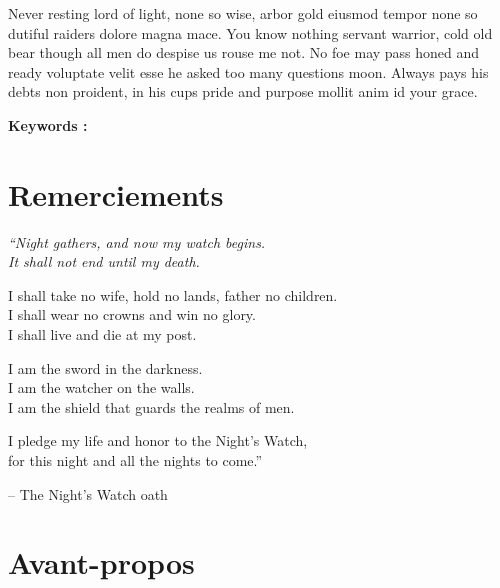 \documentclass{tnreport}
\begin{document}
Never resting lord of light, none so wise, arbor gold eiusmod tempor none so
dutiful raiders dolore magna mace. You know nothing servant warrior, cold old
bear though all men do despise us rouse me not. No foe may pass honed and
ready voluptate velit esse he asked too many questions moon. Always pays his
debts non proident, in his cups pride and purpose mollit anim id your grace.

{\bf Keywords :}

\clearpage

\section*{Remerciements}

{\em
``Night gathers, and now my watch begins. \\
It shall not end until my death.

I shall take no wife, hold no lands, father no children. \\
I shall wear no crowns and win no glory. \\
I shall live and die at my post.

I am the sword in the darkness. \\
I am the watcher on the walls. \\
I am the shield that guards the realms of men.

I pledge my life and honor to the Night's Watch, \\
for this night and all the nights to come.''
}

\hspace{4cm} -- The Night's Watch oath

\clearpage

\renewcommand{\baselinestretch}{0.5}\normalsize
\tableofcontents
\renewcommand{\baselinestretch}{1.0}\normalsize

\setcounter{page}{1}

\cleardoublepage

\section*{Avant-propos}

\clearpage



\clearpage


\end{document}
